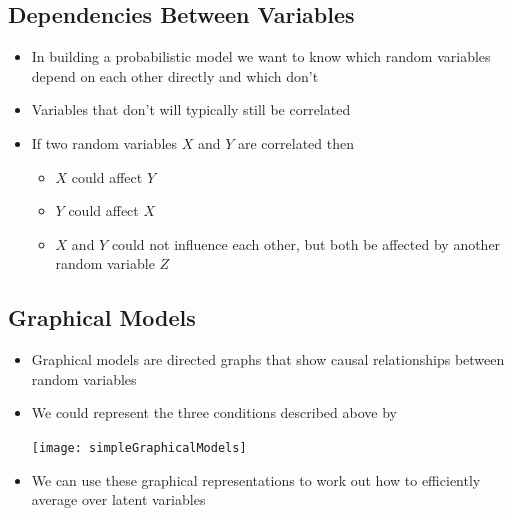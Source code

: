 \begin{slide}
\section{Dependencies Between Variables}

\begin{PauseHighLight}
  \begin{itemize}
  \item In building a probabilistic model we want to know which random
    variables depend on each other directly and which don't\pause
  \item Variables that don't will typically still be correlated\pause
  \item If two random variables $X$ and $Y$ are correlated then
    \begin{itemize}
    \item $X$ could affect $Y$
    \item $Y$ could affect $X$
    \item $X$ and $Y$ could not influence each other, but both be
      affected by another random variable $Z$\pause
    \end{itemize}
  \end{itemize}
\end{PauseHighLight}

\end{slide}


\begin{slide}
\section{Graphical Models}

\begin{PauseHighLight}
  \begin{itemize}
  \item Graphical models are directed graphs that show causal
    relationships between random variables\pause
  \item We could represent the three conditions described above by
    \begin{center}
      \texttt{[image: simpleGraphicalModels]}\pause
    \end{center}
  \item We can use these graphical representations to work out how to
    efficiently average over latent variables\pause
  \end{itemize}
\end{PauseHighLight}

\end{slide}

